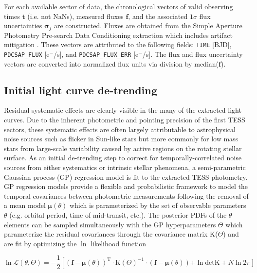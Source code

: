 For each available sector of data, the chronological vectors of valid observing times $\mathbf{t}$
(i.e. not NaNs), measured fluxes $\mathbf{f}$, and the associated $1\sigma$ flux
uncertainties $\boldsymbol{\sigma}_{f}$ are constructed. Fluxes are obtained from the Simple Aperture Photometry Pre-search
Data Conditioning extraction which includes artifact mitigation \citep{smith12}. These vectors are
attributed to the following fields: \texttt{TIME} [BJD], \texttt{PDCSAP\_FLUX} [e$^-$/s], and
\texttt{PDCSAP\_FLUX\_ERR} [e$^-$/s]. The flux and flux uncertainty vectors are converted into normalized
flux units via division by median($\mathbf{f}$).

\subsection{Initial light curve de-trending} \label{sect:detrend}
Residual systematic effects are clearly visible in the many of the extracted light curves. Due to the
inherent photometric and pointing precision of the first TESS sectors, these systematic effects
are often largely attributable to astrophysical noise sources such as flicker \citep{bastien13} in
Sun-like stars but more commonly for low mass stars from
large-scale variability caused by active regions on the rotating stellar surface. As an initial de-trending step
to correct for temporally-correlated noise sources from either systematics or intrinsic stellar phenomena,
a semi-parametric Gaussian process (GP) regression model is fit to the extracted TESS photometry. \\

GP regression models provide a flexible and probabilistic framework to model the temporal
covariances between photometric measurements following the removal of a mean model
$\boldsymbol{\mu}(\theta)$ which is parameterized by the set of observable parameters $\theta$
(e.g. orbital period, time of mid-transit, etc.). The posterior PDFs of the $\theta$ elements 
can be sampled simultaneously with the GP hyperparameters $\Theta$ which parameterize
the residual covariances through the covariance matrix K($\Theta$) and are fit by
optimizing the $\ln$ likelihood function

\begin{equation}
  \ln{\mathcal{L}(\theta,\Theta)} = 
  -\frac{1}{2} \left[ (\mathbf{f}-\boldsymbol{\mu}(\theta))^{\text{T}}
    \cdot \text{K}(\Theta)^{-1} \cdot (\mathbf{f}-\boldsymbol{\mu}(\theta)) \right. 
    \left. + \ln{\mathrm{det} \text{K}} + N \ln{2 \pi} \right] \label{eq:lnL}
\end{equation}

